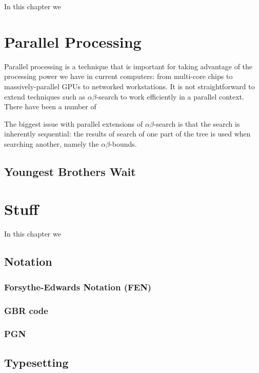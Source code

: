 \documentclass[10pt,dvipdfmx]{report}
\newcommand{\ab}{{$\alpha\beta$}}
\begin{document}
In this chapter we 

\chapter{Parallel Processing}
\label{chap-parallel}

Parallel processing is a technique that is important for taking advantage of the processing
power we have in current computers: from multi-core chips to massively-parallel GPUs to
networked workstations.  It is not straightforward to extend techniques such as \ab-search
to work efficiently in a parallel context.  There have been a number of

The biggest issue with parallel extensions of \ab-search is that the search is inherently
sequential: the results of search of one part of the tree is used when searching another, namely
the \ab-bounds.

\section{Youngest Brothers Wait}

\chapter{Stuff}
\label{chap-stuff}

In this chapter we 

\section{Notation}

\subsection{Forsythe-Edwards Notation (FEN)}
\subsection{GBR code}
\subsection{PGN}

\section{Typesetting}
\end{document}
